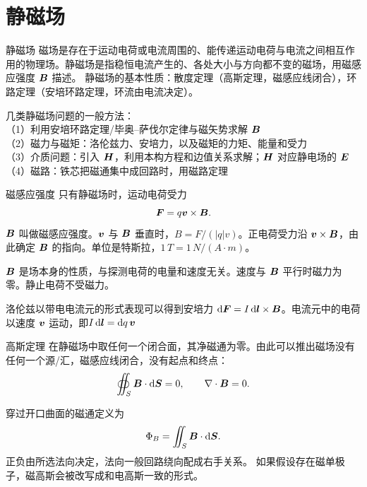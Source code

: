 \section{静磁场}
\gdef\coursepart{静磁场与磁介质}

\begin{frame}{静磁场}
磁场是存在于运动电荷或电流周围的、能传递运动电荷与电流之间相互作用的物理场。静磁场是指稳恒电流产生的、各处大小与方向都不变的磁场，用磁感应强度 $\bm{B}$ 描述。
静磁场的基本性质：散度定理（高斯定理，磁感应线闭合），环路定理（安培环路定理，环流由电流决定）。

几类静磁场问题的一般方法：\\
（1）利用安培环路定理/毕奥--萨伐尔定律与磁矢势求解 $\bm{B}$\\
（2）磁力与磁矩：洛伦兹力、安培力，以及磁矩的力矩、能量和受力\\
（3）介质问题：引入 $\bm{H}$，利用本构方程和边值关系求解；$\bm{H}$ 对应静电场的 $\bm{E}$\\
（4）磁路：铁芯把磁通集中成回路时，用磁路定理
\end{frame}

\begin{frame}{磁感应强度}
只有静磁场时，运动电荷受力
\[
 \bm{F}=q\bm{v}\times\bm{B}.
\]
$\bm{B}$ 叫做磁感应强度。$\bm{v}$ 与 $\bm{B}$ 垂直时，$B=F/(|q|v)$。正电荷受力沿 $\bm{v}\times\bm{B}$，由此确定 $\bm{B}$ 的指向。单位是特斯拉，$\unit{1\,T=1\,N/(A\cdot m)}$。

$\bm{B}$ 是场本身的性质，与探测电荷的电量和速度无关。速度与 $\bm{B}$ 平行时磁力为零。静止电荷不受磁力。

洛伦兹以带电电流元的形式表现可以得到安培力 $\mathop{}\!\mathrm d\bm{F}=I\mathop{}\!\mathrm d\bm{l}\times\bm{B}$。电流元中的电荷以速度 $\bm{v}$ 运动，即$I\mathop{}\!\mathrm d\bm{l}=\mathop{}\!\mathrm d q\,\bm{v}$
\end{frame}

\begin{frame}{高斯定理}
在静磁场中取任何一个闭合面，其净磁通为零。由此可以推出磁场没有任何一个源/汇，磁感应线闭合，没有起点和终点：
\[
 \oiint_S\bm{B}\cdot\mathop{}\!\mathrm d\bm{S}=0,
 \qquad
 \nabla\cdot\bm{B}=0.
\]

穿过开口曲面的磁通定义为
\[
 \Phi_B=\iint_S\bm{B}\cdot\mathop{}\!\mathrm d\bm{S}.
\]
正负由所选法向决定，法向一般回路绕向配成右手关系。
如果假设存在磁单极子，磁高斯会被改写成和电高斯一致的形式。
\end{frame}

